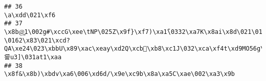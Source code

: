 \documentclass[
]{article}
\begin{document}
\begin{verbatim}
## 36                                                                                                                                                                                                                                                                                                                                                                                                                                                                                                                                                                                                                                                                                                                                                                                                                                                                                             \a\xdd\021\xf6
## 37                                                                                                                                                                                                                                                                                                                                                                                                                                                                                                                                                                                                                                                                                      \x8b@͚1\002g#\xccG\xee\tNP\025Z\x9f}\xf7)\xa1̌\0332\xa7K\x8ai\x8d\021\016\xd5\024\x96AS\xd9 \0162\x83\021\xcd?QA\xe24\023\xbbU\x89\xac\xeay\xd2Q\xcbٰ\xb8\xc1J\032\xca\xf4t\xd9MO56g\xe9\xaa\xc6\xed\xe5諐u3]\031аt1\xaa
## 38                                                                                                                                                                                                                                                                                                                                                                                                                                                                                                                                                                                                                                                                                                                                                                                                                                            \x8f&\x8b)\xbdv\xa6\006\xd6d/\x9e\xc9b\x8a\xa5C\xae\002\xa3\x9b

\end{verbatim}
\end{document}
